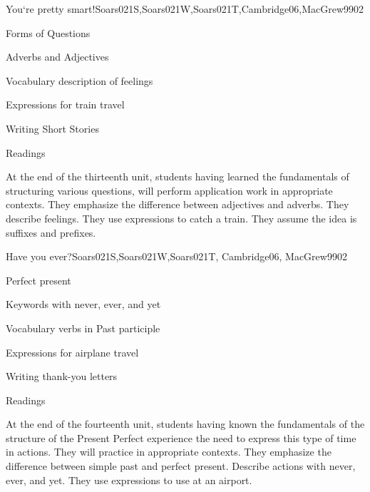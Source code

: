 \begin{syllabus}
\begin{unit}{}{You`re pretty smart!}{Soars021S,Soars021W,Soars021T,Cambridge06,MacGrew99}{0}{2}
\begin{topics}
      \item Forms of Questions
      \item Adverbs and Adjectives
      \item Vocabulary description of feelings
      \item Expressions for train travel
      \item Writing Short Stories
      \item Readings
   \end{topics}

   \begin{learningoutcomes}
      \item At the end of the thirteenth unit, students having learned the fundamentals of structuring various questions, will perform application work in appropriate contexts. They emphasize the difference between adjectives and adverbs. They describe feelings. They use expressions to catch a train. They assume the idea is suffixes and prefixes.
   \end{learningoutcomes}

\end{unit}

\begin{unit}{}{Have you ever?}{Soars021S,Soars021W,Soars021T, Cambridge06, MacGrew99}{0}{2}
   \begin{topics}
      \item Perfect present
      \item Keywords with never, ever, and yet
      \item Vocabulary verbs in Past participle
      \item Expressions for airplane travel
      \item Writing thank-you letters
      \item Readings
   \end{topics}

   \begin{learningoutcomes}
      \item At the end of the fourteenth unit, students having known the fundamentals of the structure of the Present Perfect experience the need to express this type of time in actions. They will practice in appropriate contexts. They emphasize the difference between simple past and perfect present. Describe actions with never, ever, and yet. They use expressions to use at an airport.
   \end{learningoutcomes}

\end{unit}

\begin{coursebibliography}
\end{coursebibliography}

\end{syllabus}
%
